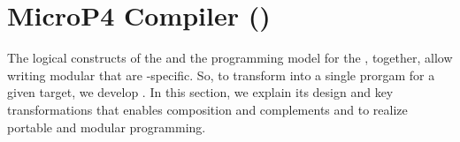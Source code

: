 \documentclass[letterpaper,twocolumn,10pt]{article}
\begin{document}



\section{MicroP4 Compiler (\ucomp)}
\label{sec:compiler}

The logical constructs of the \uarch and the programming model 
for the \uswitch, together, allow writing modular \uprograms that are 
\uswitch-specific. So, to transform \uprograms into a single prorgam 
for a given target, we develop \ucomp. In this section, we explain 
its design and key transformations that enables composition and 
complements \uarch and \uswitch to realize portable and modular 
programming. 
\end{document}
